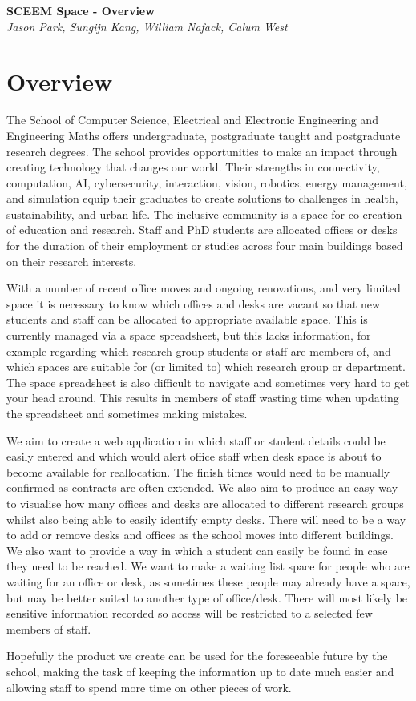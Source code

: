 \documentclass[11pt,a4paper]{article}
\begin{document}
\begin{titlepage}
   \begin{center}
      \Large\textbf{SCEEM Space - Overview}\\
      \large\textit{Jason Park, Sungijn Kang, William Nafack, Calum West}
   \end{center}
\end{titlepage}

\section{Overview}
The School of Computer Science, Electrical and Electronic Engineering and Engineering Maths offers undergraduate, postgraduate taught and postgraduate research degrees. The school provides opportunities to make an impact through creating technology that changes our world. Their strengths in connectivity, computation, AI, cybersecurity, interaction, vision, robotics, energy management, and simulation equip their graduates to create solutions to challenges in health, sustainability, and urban life. The inclusive community is a space for co-creation of education and research. Staff and PhD students are allocated offices or desks for the duration of their employment or studies across four main buildings based on their research interests.
\bigskip

With a number of recent office moves and ongoing renovations, and very limited space it is necessary to know which offices and desks are vacant so that new students and staff can be allocated to appropriate available space. This is currently managed via a space spreadsheet, but this lacks information, for example regarding which research group students or staff are members of, and which spaces are suitable for (or limited to) which research group or department. The space spreadsheet is also difficult to navigate and sometimes very hard to get your head around. This results in members of staff wasting time when updating the spreadsheet and sometimes making mistakes.
\bigskip

We aim to create a web application in which staff or student details could be easily entered and which would alert office staff when desk space is about to become available for reallocation. The finish times would need to be manually confirmed as contracts are often extended. We also aim to produce an easy way to visualise how many offices and desks are allocated to different research groups whilst also being able to easily identify empty desks. There will need to be a way to add or remove desks and offices as the school moves into different buildings. We also want to provide a way in which a student can easily be found in case they need to be reached. We want to make a waiting list space for people who are waiting for an office or desk, as sometimes these people may already have a space, but may be better suited to another type of office/desk. There will most likely be sensitive information recorded so access will be restricted to a selected  few members of staff.
\bigskip

Hopefully the product we create can be used for the foreseeable future by the school, making the task of keeping the information up to date much easier and allowing staff to spend more time on other pieces of work.
\bigskip
\end{document}
